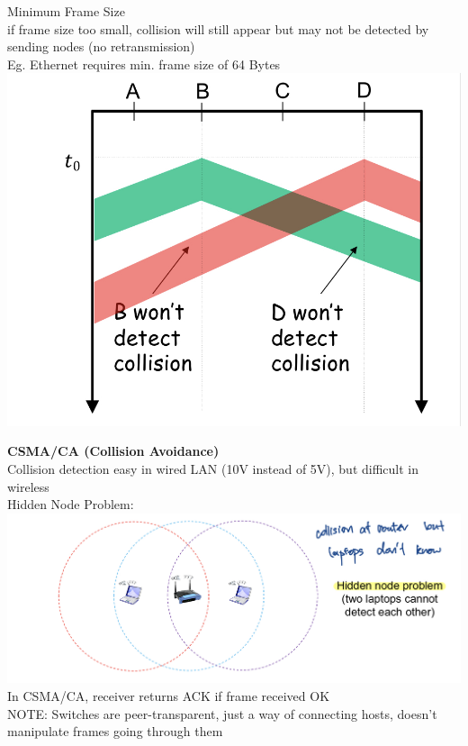 \documentclass[10pt, a4paper]{article}
\newcommand{\blue}[1]{{\color{MidnightBlue}#1}}
\newcommand{\red}[1]{{\color{red}#1}}
\begin{document}
\begin{multicols*}{3}
		Minimum Frame Size\\
		if frame size too small, \red{collision will still appear} but \red{may not be detected} by sending nodes (no retransmission)\\
		Eg. Ethernet requires min. frame size of 64 Bytes\\
		\includegraphics[scale=.14]{./assets/csmaMinFrame}

		\textbf{CSMA/CA (Collision Avoidance)}\\
		Collision detection easy in wired LAN (10V instead of 5V), but difficult in wireless\\
		Hidden Node Problem:\\
		\includegraphics[scale=.15]{./assets/hiddenNode}\\
		In CSMA/CA, receiver returns ACK if frame received OK\\

		\red{NOTE: }Switches are \blue{peer-transparent}, just a way of connecting hosts, doesn't manipulate frames going through them\\


\end{multicols*}
\end{document}
